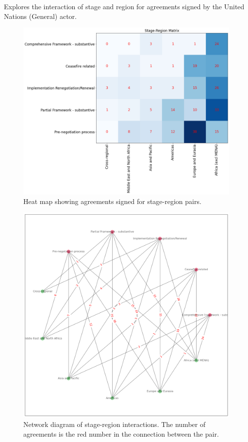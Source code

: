 \documentclass{article}
\begin{document}
Explores the interaction of stage and region for agreements signed by the United Nations (General) actor.

\begin{figure}[H]
\begin{center}
\includegraphics[scale=0.33]{./assets/figure_10.png}
\caption{Heat map showing agreements signed for stage-region pairs.}
\end{center}
\end{figure}


\begin{figure}[H]
\begin{center}
\includegraphics[scale=0.38]{./assets/figure_13.png}
\caption{Network diagram of stage-region interactions. The number of agreements is the red number in the connection between the pair.}
\end{center}
\end{figure}
\end{document}
